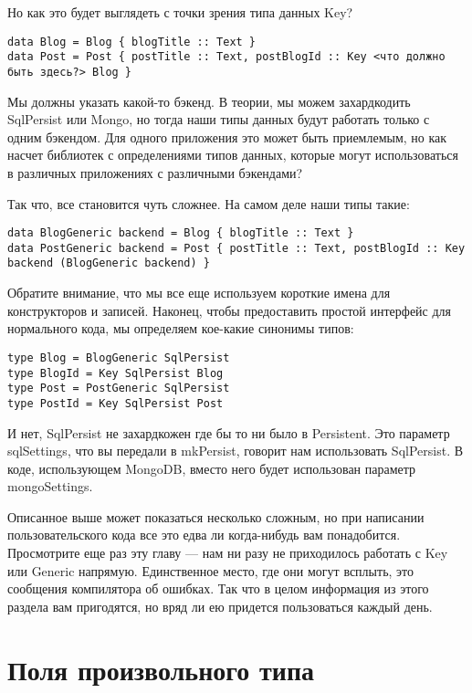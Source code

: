 Но как это будет выглядеть с точки зрения типа данных Key?

\begin{lstlisting}
data Blog = Blog { blogTitle :: Text }
data Post = Post { postTitle :: Text, postBlogId :: Key <что должно быть здесь?> Blog }
\end{lstlisting}

Мы должны указать какой-то бэкенд. В теории, мы можем захардкодить SqlPersist или Mongo, но тогда наши типы данных будут работать только с одним бэкендом. Для одного приложения это может быть приемлемым, но как насчет библиотек с определениями типов данных, которые могут использоваться в различных приложениях с различными бэкендами?

Так что, все становится чуть сложнее. На самом деле наши типы такие:

\begin{lstlisting}
data BlogGeneric backend = Blog { blogTitle :: Text }
data PostGeneric backend = Post { postTitle :: Text, postBlogId :: Key backend (BlogGeneric backend) }
\end{lstlisting}

Обратите внимание, что мы все еще используем короткие имена для конструкторов и записей. Наконец, чтобы предоставить простой интерфейс для нормального кода, мы определяем кое-какие синонимы типов:

\begin{lstlisting}
type Blog = BlogGeneric SqlPersist
type BlogId = Key SqlPersist Blog
type Post = PostGeneric SqlPersist
type PostId = Key SqlPersist Post
\end{lstlisting}

И нет, SqlPersist не захардкожен где бы то ни было в Persistent. Это параметр sqlSettings, что вы передали в mkPersist, говорит нам использовать SqlPersist. В коде, использующем MongoDB, вместо него будет использован параметр mongoSettings.

Описанное выше может показаться несколько сложным, но при написании пользовательского кода все это едва ли когда-нибудь вам понадобится. Просмотрите еще раз эту главу --- нам ни разу не приходилось работать с Key или Generic напрямую. Единственное место, где они могут всплыть, это сообщения компилятора об ошибках. Так что в целом информация из этого раздела вам пригодятся, но вряд ли ею придется пользоваться каждый день.

\section{Поля произвольного типа} %

